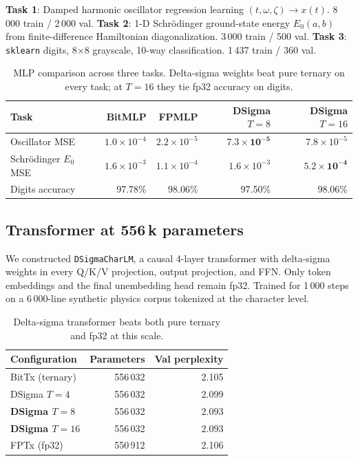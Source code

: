 \documentclass[11pt]{article}
\begin{document}
\textbf{Task 1}: Damped harmonic oscillator regression learning
$(t, \omega, \zeta) \to x(t)$. 8\,000 train / 2\,000 val.
\textbf{Task 2}: 1-D Schr\"odinger ground-state energy
$E_0(a, b)$ from finite-difference Hamiltonian diagonalization.
3\,000 train / 500 val.
\textbf{Task 3}: \texttt{sklearn} digits, 8$\times$8 grayscale,
10-way classification. 1\,437 train / 360 val.

\begin{table}[h]
\centering
\begin{tabular}{lrrrr}
\toprule
Task & BitMLP & FPMLP & DSigma $T=8$ & DSigma $T=16$ \\
\midrule
Oscillator MSE & $1.0\times10^{-4}$ & $2.2\times10^{-5}$ & $\mathbf{7.3\times10^{-5}}$ & $7.8\times10^{-5}$ \\
Schr\"odinger $E_0$ MSE & $1.6\times10^{-3}$ & $1.1\times10^{-4}$ & $1.6\times10^{-3}$ & $\mathbf{5.2\times10^{-4}}$ \\
Digits accuracy & 97.78\% & 98.06\% & 97.50\% & $\mathbf{98.06\%}$ \\
\bottomrule
\end{tabular}
\caption{MLP comparison across three tasks. Delta-sigma weights beat
pure ternary on every task; at $T=16$ they tie fp32 accuracy on
digits.}
\end{table}

\subsection{Transformer at 556\,k parameters}

We constructed \texttt{DSigmaCharLM}, a causal 4-layer transformer
with delta-sigma weights in every Q/K/V projection, output
projection, and FFN. Only token embeddings and the final unembedding
head remain fp32. Trained for 1\,000 steps on a 6\,000-line
synthetic physics corpus tokenized at the character level.

\begin{table}[h]
\centering
\begin{tabular}{lrr}
\toprule
Configuration & Parameters & Val perplexity \\
\midrule
BitTx (ternary) & 556\,032 & 2.105 \\
DSigma $T=4$ & 556\,032 & 2.099 \\
\textbf{DSigma $T=8$} & 556\,032 & $\mathbf{2.093}$ \\
\textbf{DSigma $T=16$} & 556\,032 & $\mathbf{2.093}$ \\
FPTx (fp32) & 550\,912 & 2.106 \\
\bottomrule
\end{tabular}
\caption{Delta-sigma transformer beats both pure ternary and fp32 at
this scale.}
\end{table}
\end{document}
